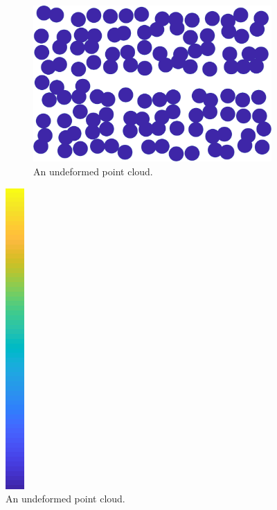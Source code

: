 \documentclass[11pt,a4paper, final, twoside]{article}
\theoremstyle{proposition}
\theoremstyle{definition}
\theoremstyle{remark}
\numberwithin{equation}{section}
\begin{document}
\begin{figure}[h]
\centering
\begin{subfigure}[t]{.5\textwidth}
  \centering
  \includegraphics[width=.7\linewidth]{blockUndef.png}
  \caption{An undeformed point cloud.}
\end{subfigure}%
\includegraphics[scale=.25]{parula.png}


\end{figure}
\end{document}
